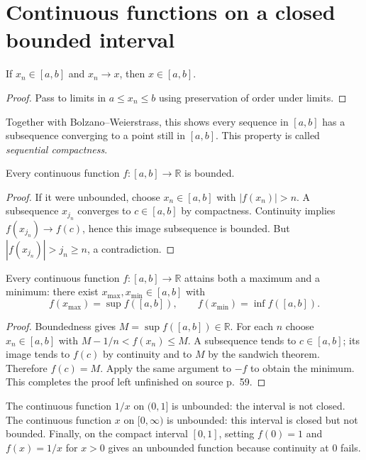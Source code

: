 \section{Continuous functions on a closed bounded interval}
\begin{lemma}
If $x_n\in[a,b]$ and $x_n\to x$, then $x\in[a,b]$.
\end{lemma}
\begin{proof}
Pass to limits in $a\leq x_n\leq b$ using preservation of order under limits.
\end{proof}
Together with Bolzano--Weierstrass, this shows every sequence in $[a,b]$
has a subsequence converging to a point still in $[a,b]$. This property
is called \emph{sequential compactness}.

\begin{theorem}[Boundedness]
Every continuous function $f:[a,b]\to\mathbb R$ is bounded.
\end{theorem}
\begin{proof}
If it were unbounded, choose $x_n\in[a,b]$ with $|f(x_n)|>n$.
A subsequence $x_{j_n}$ converges to $c\in[a,b]$ by compactness.
Continuity implies $f(x_{j_n})\to f(c)$, hence this image subsequence is
bounded. But $|f(x_{j_n})|>j_n\geq n$, a contradiction.
\end{proof}

\begin{theorem}\label{thm:analysis-evt}
Every continuous function $f:[a,b]\to\mathbb R$ attains both a maximum
and a minimum: there exist $x_{\max},x_{\min}\in[a,b]$ with
\[
f(x_{\max})=\sup f([a,b]),\qquad
f(x_{\min})=\inf f([a,b]).
\]
\end{theorem}
\begin{proof}
Boundedness gives $M=\sup f([a,b])\in\mathbb R$.
For each $n$ choose $x_n\in[a,b]$ with $M-1/n<f(x_n)\leq M$.
A subsequence tends to $c\in[a,b]$; its image tends to $f(c)$ by continuity
and to $M$ by the sandwich theorem. Therefore $f(c)=M$.
Apply the same argument to $-f$ to obtain the minimum.
This completes the proof left unfinished on source p.~59.
\end{proof}

\begin{example}
The continuous function $1/x$ on $(0,1]$ is unbounded: the interval is not
closed. The continuous function $x$ on $[0,\infty)$ is unbounded: this
interval is closed but not bounded. Finally, on the compact interval $[0,1]$,
setting $f(0)=1$ and $f(x)=1/x$ for $x>0$ gives an unbounded function
because continuity at $0$ fails.
\end{example}

